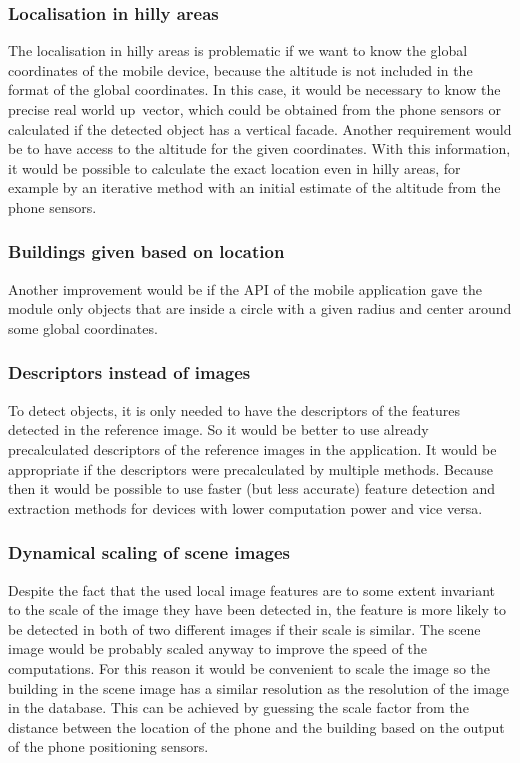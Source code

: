 \documentclass[thesis=B,english]{FITthesis}[2019/12/23]
\begin{document}
            \subsubsection*{Localisation in hilly areas}
                The localisation in hilly areas is problematic if we want to know the global coordinates of the mobile device, because the altitude is not included in the format of the global coordinates. In this case, it would be necessary to know the precise real world up~vector, which could be obtained from the phone sensors or calculated if the detected object has a vertical facade. Another requirement would be to have access to the altitude for the given coordinates. With this information, it would be possible to calculate the exact location even in hilly areas, for example by an iterative method with an initial estimate of the altitude from the phone sensors.
                
            \subsubsection*{Buildings given based on location}
                Another improvement would be if the API of the mobile application gave the module only objects that are inside a circle with a given radius and center around some global coordinates.
                
            \subsubsection*{Descriptors instead of images}
                To detect objects, it is only needed to have the descriptors of the features detected in the reference image. So it would be better to use already precalculated descriptors of the reference images in the application. It would be appropriate if the descriptors were precalculated by multiple methods. Because then it would be possible to use faster (but less accurate) feature detection and extraction methods for devices with lower computation power and vice versa.
                
            \subsubsection*{Dynamical scaling of scene images}
            Despite the fact that the used local image features are to some extent invariant to the scale of the image they have been detected in, the feature is more likely to be detected in both of two different images if their scale is similar. The scene image would be probably scaled anyway to improve the speed of the computations. For this reason it would be convenient to scale the image so the building in the scene image has a similar resolution as the resolution of the image in the database. This can be achieved by guessing the scale factor from the distance between the location of the phone and the building based on the output of the phone positioning sensors.
                
\end{document}
